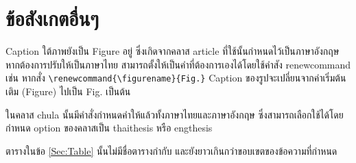 \documentclass[a4paper,12pt]{article}
\begin{document}
\section{ข้อสังเกตอื่นๆ}
Caption ใต้ภาพยังเป็น Figure อยู่ ซึ่งเกิดจากคลาส article ที่ใช้นั้นกำหนดไว้เป็นภาษาอังกฤษ หากต้องการปรับให้เป็นภาษาไทย สามารถตั้งให้เป็นคำที่ต้องการเองได้โดยใช้คำสัง renewcommand เช่น หากสั่ง \lstinline|\renewcommand{\figurename}{Fig.}| Caption ของรูปจะเปลี่ยนจากค่าเริ่มต้นเติม (Figure) ไปเป็น Fig. เป็นต้น

ในคลาส chula นั้นมีคำสั่งกำหนดคำให้แล้วทั้งภาษาไทยและภาษาอังกฤษ ซึ่งสามารถเลือกใช้ได้โดยกำหนด option ของคลาสเป็น thaithesis หรือ engthesis

ตารางในข้อ \ref{Sec:Table} นั้นไม่มีชื่อตารางกำกับ และยังยาวเกินกว่าขอบเขตของข้อความที่กำหนด



\end{document}
